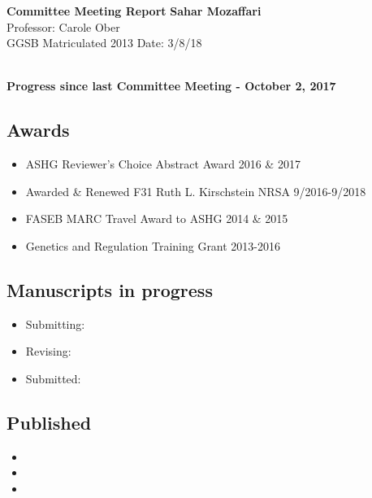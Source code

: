 \documentclass[a4paper, 11pt]{article}
\begin{document}
\noindent
\large\textbf{Committee Meeting Report} \hfill \textbf{Sahar Mozaffari} \\
\normalsize  \hfill Professor: Carole Ober  \\
GGSB Matriculated 2013 \hfill Date: 3/8/18 \\
\noindent\makebox[\linewidth]{\rule{\paperwidth}{0.4pt}}

\large\textbf{\\Progress since last Committee Meeting - October 2, 2017}
\subsection*{Awards}
\begin{itemize}
    \item ASHG Reviewer's Choice Abstract Award  \hfill 2016 \& 2017
    \item Awarded \& Renewed F31 Ruth L. Kirschstein NRSA \hfill 9/2016-9/2018
    \item FASEB MARC Travel Award to ASHG \hfill 2014 \& 2015 
    \item Genetics and Regulation Training Grant \hfill 2013-2016
\end{itemize} 

\subsection*{Manuscripts in progress}
\begin{itemize}
    \item Submitting: 
    \item Revising: 
    \item Submitted: 
\end{itemize}

\subsection*{Published}
\begin{itemize}
    \item {}
    \item {}
    \item {}
\end{itemize}
\end{document}
